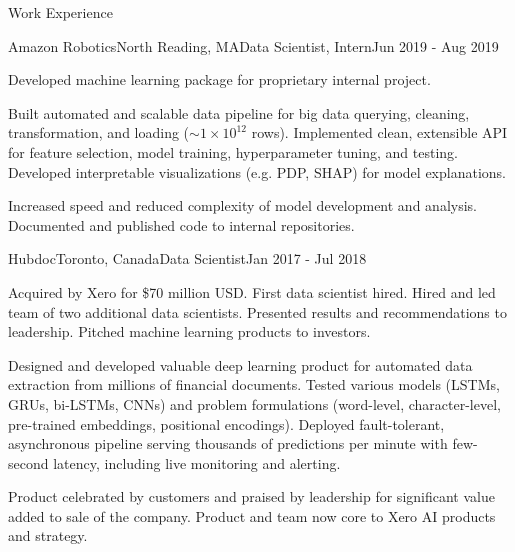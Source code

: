\documentclass{resume} %
\begin{document}
\begin{rSection}{Work Experience}

\begin{rSubsection}{Amazon Robotics}{North Reading, MA}{Data Scientist, Intern}{Jun 2019 - Aug 2019}

\item
    Developed machine learning package for proprietary internal project.

\item
    Built automated and scalable data pipeline for big data querying, cleaning, transformation, and loading (${\sim} 1 \times 10^{12}$ rows).
    Implemented clean, extensible API for feature selection, model training, hyperparameter tuning, and testing.
    Developed interpretable visualizations (e.g. PDP, SHAP) for model explanations.

\item
    Increased speed and reduced complexity of model development and analysis.
    Documented and published code to internal repositories.

\end{rSubsection}


\begin{rSubsection}{Hubdoc}{Toronto, Canada}{Data Scientist}{Jan 2017 - Jul 2018}
\item
    Acquired by Xero for \$70 million USD.
    First data scientist hired.
    Hired and led team of two additional data scientists.
    Presented results and recommendations to leadership.
    Pitched machine learning products to investors.


\item
    Designed and developed valuable deep learning product for automated
    data extraction from millions of financial documents.
    Tested various models (LSTMs, GRUs, bi-LSTMs, CNNs) and
    problem formulations (word-level, character-level,
    pre-trained embeddings, positional encodings).
    Deployed fault-tolerant, asynchronous pipeline
    serving thousands of predictions per minute with few-second
    latency, including live monitoring and alerting.

\item
    Product celebrated by customers and praised by leadership for
    significant value added to sale of the company.
    Product and team now core to Xero AI products and strategy.


\end{rSubsection}
\end{rSection}
\end{document}
